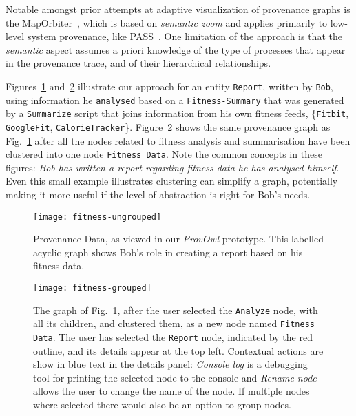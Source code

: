 Notable amongst prior attempts at adaptive visualization of provenance graphs is the MapOrbiter~\cite{Macko2011a}, which is based on \textit{semantic zoom} and applies primarily to low-level system provenance, like PASS~\cite{Macko2011}.  One limitation of the approach is that the \textit{semantic} aspect assumes a priori knowledge of the type of processes that appear in the provenance trace,  and of their hierarchical relationships.

Figures~\ref{fig:fitness-ungrouped} and~\ref{fig:fitness-grouped} illustrate our approach
for an entity \texttt{Report}, written by \texttt{Bob}, using information he \texttt{analysed}  based on a \texttt{Fitness-Summary} that was generated by a \texttt{Summarize} script that joins information 
from his own fitness feeds, \{\texttt{Fitbit}, \texttt{GoogleFit}, \texttt{CalorieTracker}\}.
Figure~\ref{fig:fitness-grouped} shows the same provenance graph as Fig.~\ref{fig:fitness-ungrouped} 
after all the nodes related to fitness analysis and summarisation have been clustered into one node \texttt{Fitness Data}. Note the common concepts in these figures: \textit{Bob has written a report regarding fitness data he has analysed himself}. Even this small example illustrates clustering can simplify a graph,
potentially making it more useful if the level of abstraction is right for Bob's needs.

\begin{figure}[h]
	\centering
	\texttt{[image: fitness-ungrouped]}
	\caption{Provenance Data, as viewed in our \textit{ProvOwl} prototype. This labelled acyclic graph shows Bob's role in creating a report based on his fitness data. }
	\label{fig:fitness-ungrouped}
\end{figure}

\begin{figure}[h]
	\centering
	\texttt{[image: fitness-grouped]}
	\caption{The graph of Fig.~\ref{fig:fitness-ungrouped}, after the user selected the \texttt{Analyze} node, with all its children, and clustered them, as a new node named \texttt{Fitness Data}. The user has selected the \texttt{Report} node, indicated by the red outline, and its details appear at the top left. Contextual actions are show in blue text in the details panel: \emph{Console log} is a debugging tool for printing the selected node to the console and \emph{Rename node} allows the user to change the name of the node. If multiple nodes where selected there would also be an option to group nodes.}
	\label{fig:fitness-grouped}
\end{figure}

